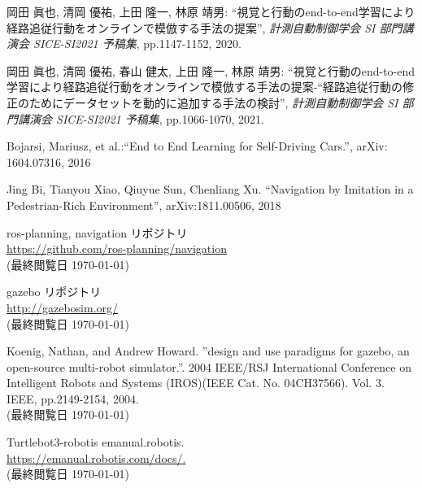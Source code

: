 \documentclass{ujarticle}
\begin{document}
\footnotesize
\begin{thebibliography}{99}

岡田 眞也, 清岡 優祐, 上田 隆一, 林原 靖男: ``視覚と行動のend-to-end学習により経路追従行動をオンラインで模倣する手法の提案'', \textit{計測自動制御学会 SI 部門講演会 SICE-SI2021 予稿集}, pp.1147-1152, 2020.

岡田 眞也, 清岡 優祐, 春山 健太, 上田 隆一, 林原 靖男: ``視覚と行動のend-to-end学習により経路追従行動をオンラインで模倣する手法の提案-“経路追従行動の修正のためにデータセットを動的に追加する手法の検討'', \textit{計測自動制御学会 SI 部門講演会 SICE-SI2021 予稿集}, pp.1066-1070, 2021.	

Bojarsi, Mariusz, et al.:``End to End Learning for Self-Driving Cars.'', arXiv: 1604.07316, 2016

Jing Bi, Tianyou Xiao, Qiuyue Sun, Chenliang Xu. ``Navigation by Imitation in a Pedestrian-Rich Environment'', 	arXiv:1811.00506, 2018


ros-planning, navigation リポジトリ\\
\url{https://github.com/ros-planning/navigation}\\
(最終閲覧日 \today)

gazebo リポジトリ\\
\url{http://gazebosim.org/}\\
(最終閲覧日 \today)

Koenig, Nathan, and Andrew Howard. ”design and use paradigms for gazebo, an open-source multi-robot simulator.”. 2004 IEEE/RSJ International Conference on Intelligent Robots and Systems (IROS)(IEEE Cat. No. 04CH37566). Vol. 3. IEEE, pp.2149-2154, 2004.\\
(最終閲覧日 \today)

Turtlebot3-robotis emanual.robotis.\\
\url{https://emanual.robotis.com/docs/.}\\
(最終閲覧日 \today)

\end{thebibliography}

\normalsize
\end{document}
